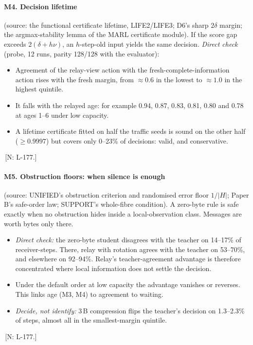 \documentclass[11pt]{article}
\theoremstyle{definition}
\newif\ifshownotes\shownotestrue
\newcommand{\NOTE}[1]{\ifshownotes{\color{notecol}\,\textsf{\footnotesize[N: #1]}}\fi}
\begin{document}
\paragraph{M4. Decision lifetime} (source: the functional certificate lifetime, LIFE2/LIFE3; D6's sharp $2\delta$ margin;
the argmax-stability lemma of the MARL certificate module). If the score gap exceeds $2(\delta+h\nu)$, an $h$-step-old
input yields the same decision. \emph{Direct check} (probe, 12 runs, parity 128/128 with the evaluator):
\begin{itemize}
\item Agreement of the relay-view action with the fresh-complete-information action rises with the fresh margin, from
$\approx0.6$ in the lowest to $\approx1.0$ in the highest quintile.
\item It falls with the relayed age: for example 0.94, 0.87, 0.83, 0.81, 0.80 and 0.78 at ages 1--6 under low capacity.
\item A lifetime certificate fitted on half the traffic seeds is sound on the other half ($\ge0.9997$) but covers only
0--23\% of decisions: valid, and conservative.
\end{itemize}
\NOTE{L-177.}

\paragraph{M5. Obstruction floors: when silence is enough} (source: UNIFIED's obstruction criterion and randomised error
floor $1/|H|$; Paper B's safe-order law; SUPPORT's whole-fibre condition). A zero-byte rule is safe exactly when no
obstruction hides inside a local-observation class. Messages are worth bytes only there.
\begin{itemize}
\item \emph{Direct check:} the zero-byte student disagrees with the teacher on 14--17\% of receiver-steps. There, relay
with rotation agrees with the teacher on 53--70\%, and elsewhere on 92--94\%. Relay's teacher-agreement advantage is
therefore concentrated where local information does not settle the decision.
\item Under the default order at low capacity the advantage vanishes or reverses. This links age (M3, M4) to agreement to
waiting.
\item \emph{Decide, not identify:} 3\,B compression flips the teacher's decision on 1.3--2.3\% of steps, almost all in the
smallest-margin quintile.
\end{itemize}
\NOTE{L-177.}
\end{document}
